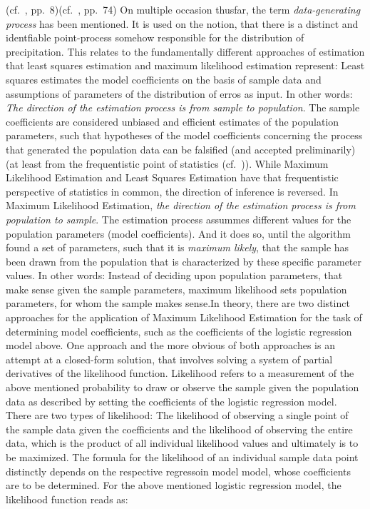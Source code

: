 \documentclass[
  12pt,
]{article}
\begin{document}
(cf.~\cite{Hosmer.2013}, pp.~8)(cf.~\cite{Wood.2017}, pp.~74) On
multiple occasion thusfar, the term \textit{data-generating process} has
been mentioned. It is used on the notion, that there is a distinct and
identfiable point-process somehow responsible for the distribution of
precipitation. This relates to the fundamentally different approaches of
estimation that least squares estimation and maximum likelihood
estimation represent: Least squares estimates the model coefficients on
the basis of sample data and assumptions of parameters of the
distribution of erros as input. In other words:
\textit{The direction of the estimation process is from sample to population}.
The sample coefficients are considered unbiased and efficient estimates
of the population parameters, such that hypotheses of the model
coefficients concerning the process that generated the population data
can be falsified (and accepted preliminarily) (at least from the
frequentistic point of statistics (cf.~\cite{Efron.1978})). While
Maximum Likelihood Estimation and Least Squares Estimation have that
frequentistic perspective of statistics in common, the direction of
inference is reversed. In Maximum Likelihood Estimation,
\textit{the direction of the estimation process is from population to sample}.
The estimation process assummes different values for the population
parameters (model coefficients). And it does so, until the algorithm
found a set of parameters, such that it is \textit{maximum likely}, that
the sample has been drawn from the population that is characterized by
these specific parameter values. In other words: Instead of deciding
upon population parameters, that make sense given the sample parameters,
maximum likelihood sets population parameters, for whom the sample makes
sense.\newline In theory, there are two distinct approaches for the
application of Maximum Likelihood Estimation for the task of determining
model coefficients, such as the coefficients of the logistic regression
model above. One approach and the more obvious of both approaches is an
attempt at a closed-form solution, that involves solving a system of
partial derivatives of the likelihood function. Likelihood refers to a
measurement of the above mentioned probability to draw or observe the
sample given the population data as described by setting the
coefficients of the logistic regression model. There are two types of
likelihood: The likelihood of observing a single point of the sample
data given the coefficients and the likelihood of observing the entire
data, which is the product of all individual likelihood values and
ultimately is to be maximized. The formula for the likelihood of an
individual sample data point distinctly depends on the respective
regressoin model model, whose coefficients are to be determined. For the
above mentioned logistic regression model, the likelihood function reads
as:
\end{document}

